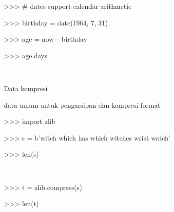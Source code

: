 \vspace{14pt}
\noindent 
{\fontsize{14pt}{14pt}\selectfont >>>  $  \#  $ dates support calendar arithmetic \\} \par
\vspace{14pt}
\noindent 
{\fontsize{14pt}{14pt}\selectfont >>> birthday = date(1964, 7, 31) \\} \par
\vspace{14pt}
\noindent 
{\fontsize{14pt}{14pt}\selectfont >>> age = now – birthday \\} \par
\vspace{14pt}
\noindent 
{\fontsize{14pt}{14pt}\selectfont >>> age.days \\} \par
\noindent 
{\fontsize{14pt}{14pt} \\} \par
\vspace{14pt}
\noindent 
{\fontsize{14pt}{14pt}\selectfont Data kompresi  \\} \par
\noindent 
{\fontsize{14pt}{14pt}\selectfont data umum untuk pengarsipan dan kompresi format \\} \par
\vspace{14pt}
\noindent 
{\fontsize{14pt}{14pt}\selectfont >>> import zlib \\} \par
\vspace{14pt}
\noindent 
{\fontsize{14pt}{14pt}\selectfont >>> s = b'witch which has which witches wrist watch' \\} \par
\vspace{14pt}
\noindent 
{\fontsize{14pt}{14pt}\selectfont >>> len(s) \\} \par
\noindent 
{\fontsize{14pt}{14pt} \\} \par
\vspace{14pt}
\noindent 
{\fontsize{14pt}{14pt}\selectfont >>> t = zlib.compress(s) \\} \par
\vspace{14pt}
\noindent 
{\fontsize{14pt}{14pt}\selectfont >>> len(t) \\} \par
\noindent 
